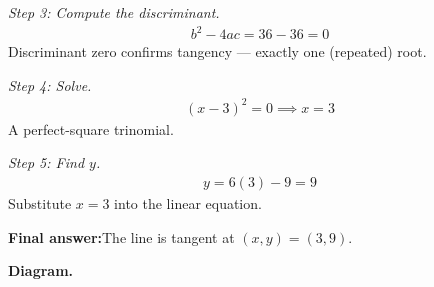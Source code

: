\documentclass[11pt]{article}
\begin{document}
\textit{Step 3: Compute the discriminant.}
\[\begin{gathered}
b^2 - 4ac = 36 - 36 = 0
\end{gathered}\]
Discriminant zero confirms tangency --- exactly one (repeated) root.

\textit{Step 4: Solve.}
\[\begin{gathered}
(x - 3)^2 = 0 \implies x = 3
\end{gathered}\]
A perfect-square trinomial.

\textit{Step 5: Find \( y \).}
\[\begin{gathered}
y = 6(3) - 9 = 9
\end{gathered}\]
Substitute \( x = 3 \) into the linear equation.

\begin{answerbox}
\textbf{Final answer:}\quad The line is tangent at \(\displaystyle (x, y) = (3, 9)\).
\end{answerbox}
\textbf{Diagram.}
\end{document}
